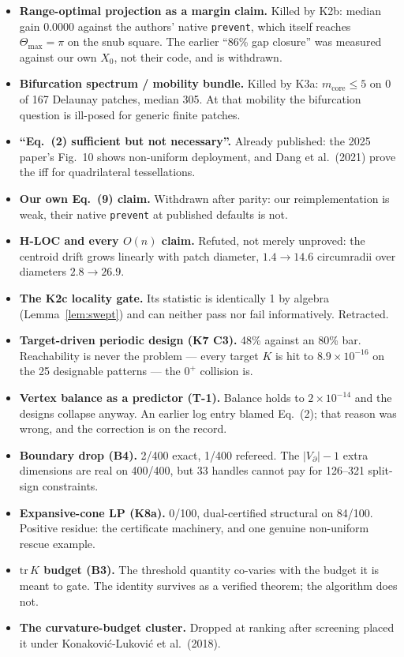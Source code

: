 \documentclass[11pt,a4paper]{article}
\theoremstyle{definition}
\newcommand{\Tmax}{\Theta_{\max}}
\newcommand{\file}[1]{\texttt{\small #1}}
\begin{document}
\begin{itemize}\itemsep3pt
\item \textbf{Range-optimal projection as a margin claim.} Killed by K2b: median gain
$0.0000$ against the authors' native \file{prevent}, which itself reaches $\Tmax=\pi$ on the
snub square. The earlier ``86\% gap closure'' was measured against our own $X_0$, not their
code, and is withdrawn.
\item \textbf{Bifurcation spectrum / mobility bundle.} Killed by K3a: $m_{\mathrm{core}}\le5$
on 0 of 167 Delaunay patches, median 305. At that mobility the bifurcation question is
ill-posed for generic finite patches.
\item \textbf{``Eq.~(2) sufficient but not necessary''.} Already published: the 2025 paper's
Fig.~10 shows non-uniform deployment, and Dang et al.\ (2021) prove the iff for quadrilateral
tessellations.
\item \textbf{Our own Eq.~(9) claim.} Withdrawn after parity: our reimplementation is weak,
their native \file{prevent} at published defaults is not.
\item \textbf{H-LOC and every $O(n)$ claim.} Refuted, not merely unproved: the centroid drift
grows linearly with patch diameter, $1.4\to14.6$ circumradii over diameters $2.8\to26.9$.
\item \textbf{The K2c locality gate.} Its statistic is identically 1 by algebra
(Lemma~\ref{lem:swept}) and can neither pass nor fail informatively. Retracted.
\item \textbf{Target-driven periodic design (K7 C3).} 48\% against an 80\% bar. Reachability is
never the problem --- every target $K$ is hit to $8.9\times10^{-16}$ on the 25 designable
patterns --- the $0^+$ collision is.
\item \textbf{Vertex balance as a predictor (T-1).} Balance holds to $2\times10^{-14}$ and the
designs collapse anyway. An earlier log entry blamed Eq.~(2); that reason was wrong, and the
correction is on the record.
\item \textbf{Boundary drop (B4).} 2/400 exact, 1/400 refereed. The $|V_\partial|-1$ extra
dimensions are real on 400/400, but 33 handles cannot pay for 126--321 split-sign constraints.
\item \textbf{Expansive-cone LP (K8a).} 0/100, dual-certified structural on 84/100. Positive
residue: the certificate machinery, and one genuine non-uniform rescue example.
\item \textbf{$\mathrm{tr}\,K$ budget (B3).} The threshold quantity co-varies with the budget
it is meant to gate. The identity survives as a verified theorem; the algorithm does not.
\item \textbf{The curvature-budget cluster.} Dropped at ranking after screening placed it under
Konakovi\'c-Lukovi\'c et al.\ (2018).
\end{itemize}
\end{document}
